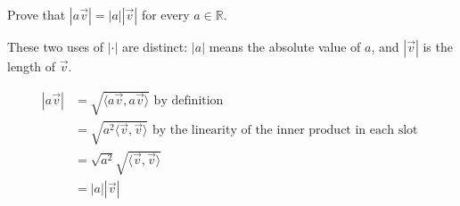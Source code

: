 \documentclass{ximera}
\begin{document}
Prove that $|a\vec{v}| = |a| |\vec{v}|$ for every $a \in \mathbb{R}$. 

\begin{warning}
  These two uses of $|\cdot|$ are distinct: $|a|$ means the absolute
  value of $a$, and $|\vec{v}|$ is the length of $\vec{v}$.
\end{warning}

\begin{free-response}
  \begin{align*}
    |a\vec{v}|
    &= \sqrt{\langle a\vec{v},a\vec{v}\rangle} \text{ by definition}\\
    &= \sqrt{a^2\langle \vec{v},\vec{v}\rangle} \text{ by the linearity of the inner product in each slot }\\
    &= \sqrt{a^2} \sqrt{\langle \vec{v},\vec{v}\rangle}\\
    &= |a| |\vec{v}|
  \end{align*}
\end{free-response}
\end{document}
